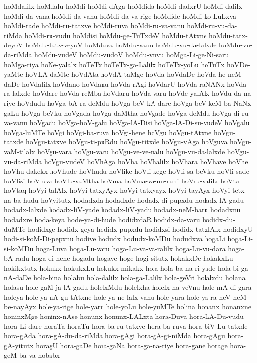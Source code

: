 {hoMdalilx
hoMdalu
hoMdi
hoMdi-dAga
hoMdida
hoMdi-dadxrU
hoMdi-dalilx
hoMdi-da-vana
hoMdi-da-vanu
hoMdi-da-va-rige
hoMdide
hoMdi-ko-LuLxva
hoMdi-rade
hoMdi-ru-tatxve
hoMdi-ruva
hoMdi-ru-va-vanu
hoMdi-ru-vu-da-riMda
hoMdi-ru-vudu
hoMdisi
hoMdu-ge-TuTxdeV
hoMdu-tAtxne
hoMdu-tatx-deyoV
hoMdu-tatx-veyoV
hoMduva
hoMdu-vanu
hoMdu-vu-da-lalxde
hoMdu-vu-da-riMda
hoMdu-vudeV
hoMdu-vudoV
hoMdu-vuvu
hoMga-Li-ge-Ni-saru
hoMga-riya
hoNe-yalalx
hoTeTx
hoTeTx-ga-Lalilx
hoTeTx-yoLu
hoTuTx
hoVDe-yaMte
hoVLA-daMte
hoVdAta
hoVdA-taMge
hoVda
hoVdaDe
hoVda-he-neM-daDe
hoVdalilx
hoVdano
hoVdanu
hoVda-rAgi
hoVdarU
hoVda-raNANx
hoVda-ra-lalxde
hoVdare
hoVda-reMba
hoVdaru
hoVda-varu
hoVde-yalAlx
hoVdu-da-na-riye
hoVdudu
hoVga-bA-ra-deMdu
hoVga-beV-kA-dare
hoVga-beV-keM-ba-NaNx-gaLu
hoVga-beVku
hoVgada
hoVga-daMtha
hoVgade
hoVga-deMdu
hoVga-di-ru-va-vanu
hoVgadu
hoVga-hoV-galu
hoVga-lA-Disi
hoVga-lA-Di-su-vudeV
hoVgalu
hoVga-luMTe
hoVgi
hoVgi-ba-ruva
hoVgi-hene
hoVgu
hoVgu-tAtxne
hoVgu-tatxde
hoVgu-tatxve
hoVgu-ti-puRdu
hoVgu-titxde
hoVgu-vAga
hoVguva
hoVgu-vaM-tilalx
hoVgu-vara
hoVgu-varu
hoVgu-ve-ve-nalu
hoVgu-vu-da-lalxde
hoVgu-vu-da-riMda
hoVgu-vudeV
hoVhAga
hoVha
hoVhalilx
hoVhara
hoVhave
hoVhe
hoVhu-dakekx
hoVhude
hoVhudu
hoVlike
hoVli-kege
hoVli-sa-beVku
hoVli-sade
hoVlisi
hoVluva
hoVlu-vaMtha
hoVma
hoVma-va-nu-ruhi
hoVru-valilx
hoVta
hoVtaq
hoVyi-talAlx
hoVyi-tatxyAyx
hoVyi-tatxyayx
hoVyi-tayAyx
hoVyi-tetx-na-ba-hudu
hoVyitutx
hodadxda
hodadxde
hodadx-di-pupxdu
hodadx-lA-gadu
hodadx-lalxde
hodadx-liV-yade
hodadx-liV-yadu
hodadx-neM-baru
hodadxnu
hodadxre
hoda-keya
hode-ya-di-hude
hodidxdaR
hodidx-da-varu
hodidx-du-duMTe
hodidxge
hodidx-geya
hodidx-pupxdu
hodidxsi
hodidx-tatxlAlx
hodidxyU
hodi-si-koM-Di-pepxnu
hodive
hodudx
hodudx-koMDu
hodudxva
hogaLi
hoga-Li-si-koMDu
hoga-Luva
hoga-Lu-varu
hoga-Lu-va-va-ralilx
hoga-Lu-vu-dara
hoga-bA-radu
hoga-di-hene
hogadu
hogave
hoge
hogi-situtx
hokakxDe
hokakxLu
hokikxtutx
hokukx
hokukxLu
hokukx-mikakx
hola
hola-ba-na-ri-yade
hola-bi-ga-nA-daDe
hola-bina
holabu
hola-dalilx
hola-ga-Lalilx
hola-geVri
holalxdu
holana
holasu
hole-gaM-ja-lA-gadu
holelxMdu
holelxha
holelx-ha-veVnu
hole-mA-di-gara
holeya
hole-ya-nA-gu-tAtxne
hole-ya-ne-lalx-vanu
hole-yara
hole-ya-ra-neV-neM-be-nayAyx
hole-ya-rige
hole-yaru
hole-yoLu
hole-yuMTe
holina
honanx
honanxne
honinxMge
honinx-nAse
honunx
honunx-LALxta
hora-Duva
hora-LA-Du-vudu
hora-Li-dare
horaTa
horaTu
hora-ba-ru-tatxve
hora-ba-ruva
hora-biV-Lu-tatxde
hora-gAda
hora-gA-du-da-riMda
hora-gAgi
hora-gA-gi-niMda
hora-gAgu
hora-gA-yitutx
horagU
hora-gaDe
hora-gaNa
hora-ga-na-riye
hora-gane
horage
hora-geM-ba-va-nobabx
}
